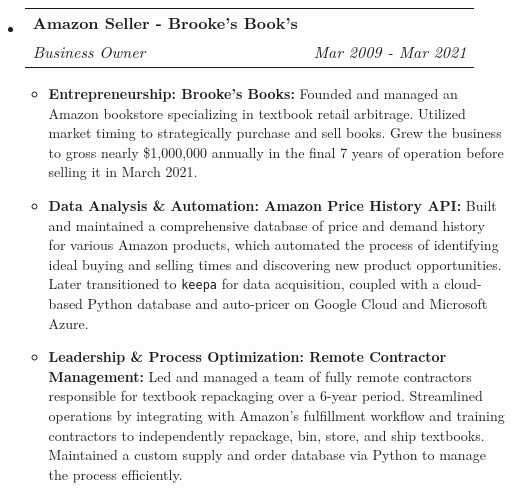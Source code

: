 \documentclass[letterpaper,11pt]{article}
\makeatletter
\newcommand{\resitem}[1]{\item #1 \vspace{-2pt}}
\newcommand{\ressubheading}[4]{
\begin{tabular*}{7.0in}{l@{\extracolsep{\fill}}r}
		\textbf{#1} & #2 \\
		\textit{#3} & \textit{#4} \\
\end{tabular*}\vspace{-6pt}}
\makeatother
\begin{document}
\begin{itemize}
\item
  \ressubheading{Amazon Seller - Brooke's Book's}{}{Business Owner}{Mar 2009 - Mar 2021}
  \begin{itemize}
    \resitem{\textbf{Entrepreneurship: Brooke's Books:} Founded and managed an Amazon bookstore specializing in textbook retail arbitrage. Utilized market timing to strategically purchase and sell books. Grew the business to gross nearly \$1,000,000 annually in the final 7 years of operation before selling it in March 2021.}
    \resitem{\textbf{Data Analysis & Automation: Amazon Price History API:} Built and maintained a comprehensive database of price and demand history for various Amazon products, which automated the process of identifying ideal buying and selling times and discovering new product opportunities. Later transitioned to \texttt{keepa} for data acquisition, coupled with a cloud-based Python database and auto-pricer on Google Cloud and Microsoft Azure.}
    \resitem{\textbf{Leadership & Process Optimization: Remote Contractor Management:} Led and managed a team of fully remote contractors responsible for textbook repackaging over a 6-year period. Streamlined operations by integrating with Amazon's fulfillment workflow and training contractors to independently repackage, bin, store, and ship textbooks. Maintained a custom supply and order database via Python to manage the process efficiently.}
  \end{itemize}


\end{itemize}
\end{document}
